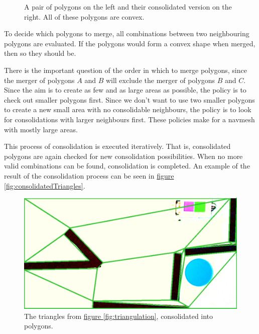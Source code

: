 \documentclass[10pt, abstracton, twocolumn]{scrartcl}
\newcommand{\fref}[1]{\hyperref[#1]{figure \vref{#1}}}
\begin{document}
\begin{figure}
        \centering
        \begin{subfigure}[t]{0.45\columnwidth}
        \centering
        
        \end{subfigure}
        \begin{subfigure}[t]{0.45\columnwidth}
        \centering
        
        \end{subfigure}
        \caption{\small A pair of polygons on the left and their consolidated version on the right. All of these polygons are convex.}
        \label{fig:consolidation}
\end{figure}

To decide which polygons to merge, all combinations between two neighbouring polygons are evaluated. If the polygons would form a convex shape when merged, then so they should be.

There is the important question of the order in which to merge polygons, since the merger of polygons $A$ and $B$ will exclude the merger of polygons $B$ and $C$. Since the aim is to create as few and as large areas as possible, the policy is to check out smaller polygons first. Since we don't want to use two smaller polygons to create a new small area with no consolidable neighbours, the policy is to look for consolidations with larger neighbours first. These policies make for a navmesh with mostly large areas.

This process of consolidation is executed iteratively. That is, consolidated polygons are again checked for new consolidation possibilities. When no more valid combinations can be found, consolidation is completed. An example of the result of the consolidation process can be seen in \fref{fig:consolidatedTriangles}.

\begin{figure}
        \centering
        \includegraphics[width=\columnwidth]{pictures/consolidatedTriangles.png}
        \caption{\small The triangles from \fref{fig:triangulation}, consolidated into polygons.}
        \label{fig:consolidatedTriangles}
\end{figure}
\end{document}
